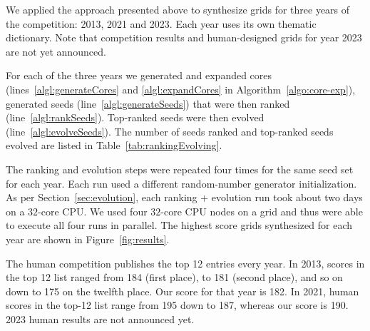 We applied the approach presented above to synthesize grids for three years of the competition: 2013, 2021 and 2023. Each year uses its own thematic dictionary. Note that competition results and human-designed grids for year 2023 are not yet announced.

For each of the three years we generated and expanded cores (lines~\ref{algl:generateCores} and \ref{algl:expandCores} in Algorithm~\ref{algo:core-exp}), generated seeds (line~\ref{algl:generateSeeds}) that were then ranked (line~\ref{algl:rankSeeds}). Top-ranked seeds were then evolved (line~\ref{algl:evolveSeeds}). The number of seeds ranked and top-ranked seeds evolved are listed in Table~\ref{tab:rankingEvolving}.


The ranking and evolution steps were repeated four times for the same seed set for each year. Each run used a different random-number generator initialization. As per Section~\ref{sec:evolution}, each ranking + evolution run took about two days on a $32$-core CPU. We used four $32$-core CPU nodes on a grid and thus were able to execute all four runs in parallel. The highest score grids synthesized for each year are shown in Figure~\ref{fig:results}. 

The human competition publishes the top 12 entries every year.
In 2013, scores in the top 12 list ranged from 184 (first place), to 181 (second place), and so on down to 175 on the twelfth place.
Our score for that year is 182.
In 2021, human scores in the top-12 list range from 195 down to 187, whereas our score is 190.
2023 human results are not announced yet.



